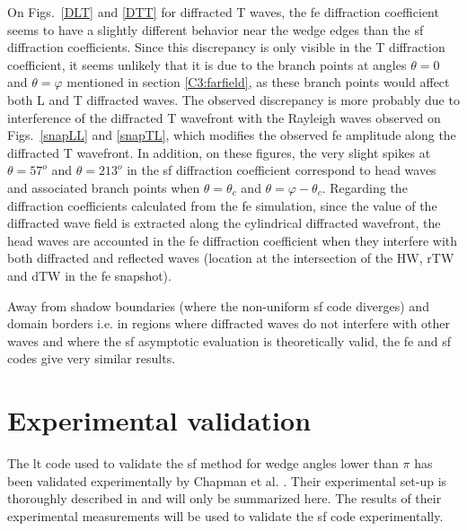 On Figs.~\ref{DLT} and \ref{DTT} for diffracted T waves, the \acrshort{fe} diffraction coefficient seems to have a slightly different behavior near the wedge edges than the \acrshort{sf} diffraction coefficients. Since this discrepancy is only visible in the T diffraction coefficient, it seems unlikely that it is due to the branch points at angles $\theta=0$ and $\theta=\varphi$ mentioned in section \ref{C3:farfield}, as these branch points would affect both L and T diffracted waves. The observed discrepancy is more probably due to interference of the diffracted T wavefront with the Rayleigh waves observed on Figs.~\ref{snapLL} and \ref{snapTL}, which modifies the observed \acrshort{fe} amplitude along the diffracted T wavefront. In addition, on these figures, the very slight spikes at $\theta=57^o$ and $\theta=213^o$ in the \acrshort{sf} diffraction coefficient correspond to head waves and associated branch points when $\theta=\theta_c$ and $\theta=\varphi-\theta_c$. Regarding the diffraction coefficients calculated from the \acrshort{fe} simulation, since the value of the diffracted wave field is extracted along the cylindrical diffracted wavefront, the head waves are accounted in the \acrshort{fe} diffraction coefficient when they interfere with both diffracted and reflected waves (location at the intersection of the HW, rTW and dTW in the \acrshort{fe} snapshot). 

Away from shadow boundaries (where the non-uniform \acrshort{sf} code diverges) and domain borders i.e. in regions where diffracted waves do not interfere with other waves and where the \acrshort{sf} asymptotic evaluation is theoretically valid, the \acrshort{fe} and \acrshort{sf} codes give very similar results. 

\section{Experimental validation}
\label{C3:expval}
The \acrshort{lt} code used to validate the \acrshort{sf} method for wedge angles lower than $\pi$ has been validated experimentally by Chapman et al. \cite{ChapmanBurch}. Their experimental set-up is thoroughly described in \cite{ChapmanBurch} and will only be summarized here. The results of their experimental measurements will be used to validate the \acrshort{sf} code experimentally.

